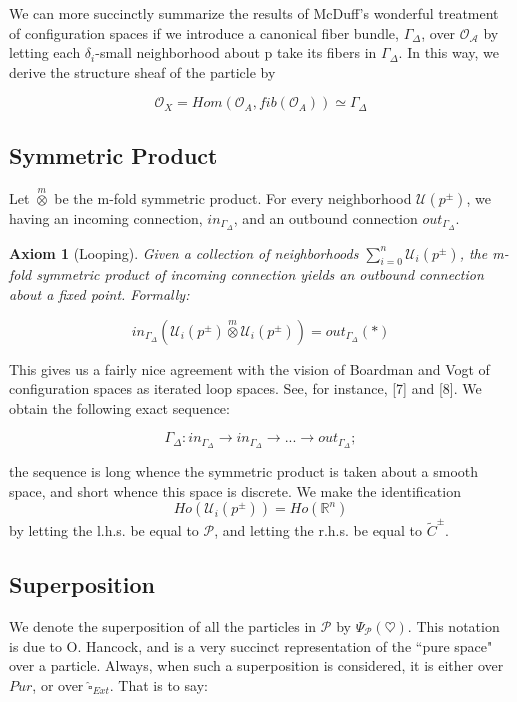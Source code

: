 \documentclass{article}
\newtheorem{ax}{Axiom}
\begin{document}
We can more succinctly summarize the results of McDuff's wonderful treatment of configuration spaces if we introduce a canonical fiber bundle, $\Gamma_\Delta$, over $\mathcal{O}_\mathcal{A}$ by letting each $\delta_i$-small neighborhood about p take its fibers in $\Gamma_\Delta$. In this way, we derive the structure sheaf of the particle by

$$\mathcal{O}_X = Hom(\mathcal{O}_A, fib(\mathcal{O}_A)) \simeq \Gamma_\Delta$$

\subsection{Symmetric Product}
Let $\overset{m}{\otimes}$ be the m-fold symmetric product. For every neighborhood $\mathcal{U}(p^\pm)$, we having an incoming connection, $in_{\Gamma_\Delta}$, and an outbound connection $out_{\Gamma_\Delta}$. 

\begin{ax}[Looping]
	Given a collection of neighborhoods $\sum_{i=0}^{n}{\mathcal{U}_i(p^\pm)}$, the m-fold symmetric product of incoming connection yields an outbound connection about a fixed point. Formally:
	
	\begin{equation}
		in_{\Gamma_\Delta}(\mathcal{U}_i(p^\pm) \overset{m}{\otimes} \mathcal{U}_i(p^\pm)) = out_{\Gamma_\Delta}(\ast)
	\end{equation}
\end{ax}

This gives us a fairly nice agreement with the vision of Boardman and Vogt of configuration spaces as iterated loop spaces. See, for instance, [7] and [8]. We obtain the following exact sequence:

$$\Gamma_\Delta: in_{\Gamma_\Delta} \to in_{\Gamma_\Delta} \to ... \to out_{\Gamma_\Delta};$$

the sequence is long whence the symmetric product is taken about a smooth space, and short whence this space is discrete. We make the identification $$Ho(\mathcal{U}_i(p^\pm)) = Ho(\mathbb{R}^n)$$ by letting the l.h.s. be equal to $\mathcal{P}$, and letting the r.h.s. be equal to $\tilde{C}^\pm$. 

\subsection{Superposition}
We denote the superposition of all the particles in $\mathcal{P}$ by $\Psi_\mathcal{P}(\heartsuit)$. This notation is due to O. Hancock, and is a very succinct representation of the ``pure space" over a particle. Always, when such a superposition is considered, it is either over $Pur$, or over $\widehat{\square}_{Ext}$. That is to say:
\end{document}
